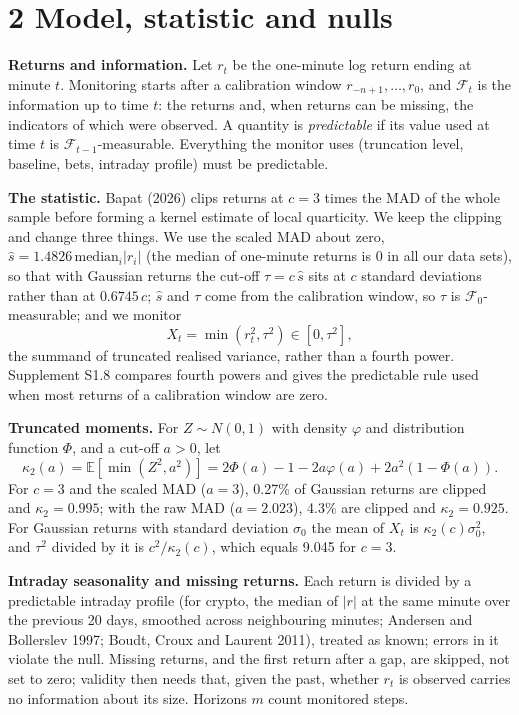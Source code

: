 \documentclass[
]{article}
\begin{document}
\hypertarget{model-statistic-and-nulls}{%
\section{2 Model, statistic and nulls}\label{model-statistic-and-nulls}}

\textbf{Returns and information.} Let \(r_t\) be the one-minute log
return ending at minute \(t\). Monitoring starts after a calibration
window \(r_{-n+1}, \dots, r_0\), and \(\mathcal{F}_t\) is the
information up to time \(t\): the returns and, when returns can be
missing, the indicators of which were observed. A quantity is
\emph{predictable} if its value used at time \(t\) is
\(\mathcal{F}_{t-1}\)-measurable. Everything the monitor uses
(truncation level, baseline, bets, intraday profile) must be
predictable.

\textbf{The statistic.} Bapat (2026) clips returns at \(c = 3\) times
the MAD of the whole sample before forming a kernel estimate of local
quarticity. We keep the clipping and change three things. We use the
scaled MAD about zero,
\(\hat s = 1.4826\,\mathrm{median}_i \lvert r_i\rvert\) (the median of
one-minute returns is 0 in all our data sets), so that with Gaussian
returns the cut-off \(\tau = c\,\hat s\) sits at \(c\) standard
deviations rather than at \(0.6745\,c\); \(\hat s\) and \(\tau\) come
from the calibration window, so \(\tau\) is
\(\mathcal{F}_0\)-measurable; and we monitor \[
X_t = \min(r_t^2, \tau^2) \in [0, \tau^2],
\] the summand of truncated realised variance, rather than a fourth
power. Supplement S1.8 compares fourth powers and gives the predictable
rule used when most returns of a calibration window are zero.

\textbf{Truncated moments.} For \(Z \sim N(0,1)\) with density
\(\varphi\) and distribution function \(\Phi\), and a cut-off \(a > 0\),
let \[
\kappa_2(a) = \mathbb{E}[\min(Z^2, a^2)] = 2\Phi(a) - 1 - 2a\varphi(a) + 2a^2(1 - \Phi(a)).
\] For \(c = 3\) and the scaled MAD (\(a = 3\)), 0.27\% of Gaussian
returns are clipped and \(\kappa_2 = 0.995\); with the raw MAD
(\(a = 2.023\)), 4.3\% are clipped and \(\kappa_2 = 0.925\). For
Gaussian returns with standard deviation \(\sigma_0\) the mean of
\(X_t\) is \(\kappa_2(c)\sigma_0^2\), and \(\tau^2\) divided by it is
\(c^2/\kappa_2(c)\), which equals 9.045 for \(c = 3\).

\textbf{Intraday seasonality and missing returns.} Each return is
divided by a predictable intraday profile (for crypto, the median of
\(\lvert r\rvert\) at the same minute over the previous 20 days,
smoothed across neighbouring minutes; Andersen and Bollerslev 1997;
Boudt, Croux and Laurent 2011), treated as known; errors in it violate
the null. Missing returns, and the first return after a gap, are
skipped, not set to zero; validity then needs that, given the past,
whether \(r_t\) is observed carries no information about its size.
Horizons \(m\) count monitored steps.
\end{document}
